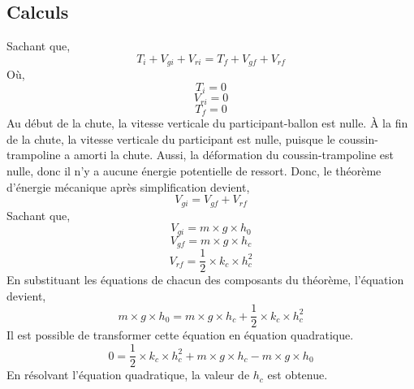 \documentclass[12pt]{article}
\begin{document}
\subsection{Calculs}
Sachant que,
\begin{equation}
T_i + V_{gi} + V_{ri} = T_f + V_{gf} + V_{rf}
\end{equation}
Où,
\begin{equation}
T_i = 0
\end{equation}
\begin{equation}
V_{ri} = 0
\end{equation}
\begin{equation}
T_f = 0
\end{equation}
\newline
Au début de la chute, la vitesse verticale du participant-ballon est nulle. À la fin de la chute, la vitesse verticale du participant est nulle, puisque le coussin-trampoline a amorti la chute. Aussi, la déformation du coussin-trampoline est nulle, donc il n'y a aucune énergie potentielle de ressort. 
\newline
\newline
Donc, le théorème d'énergie mécanique après simplification devient,
\begin{equation}
V_{gi} = V_{gf} + V_{rf} 
\end{equation}
Sachant que,
\begin{equation}
V_{gi} = m \times g \times h_0 
\end{equation}
\begin{equation}
V_{gf} = m \times g \times h_c 
\end{equation}
\begin{equation}
V_{rf} = \frac{1}{2} \times k_c \times h_c^2
\end{equation}
\newline
En substituant les équations de chacun des composants du théorème, l'équation devient,
\begin{equation}
m \times g \times h_0 = m \times g \times h_c + \frac{1}{2} \times k_c \times h_c^2
\end{equation}
\newline
\newline
Il est possible de transformer cette équation en équation quadratique.
\begin{equation}
0 = \frac{1}{2} \times k_c \times h_c^2 + m \times g \times h_c - m \times g \times h_0
\end{equation}
\newline
En résolvant l'équation quadratique, la valeur de $h_c$ est obtenue.
\end{document}
